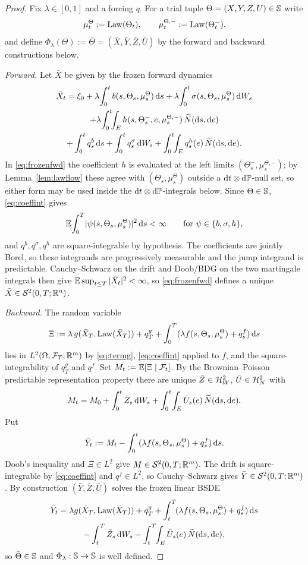 \begin{proof}
Fix $\lambda\in[0,1]$ and a forcing $q$. For a trial tuple $\Theta=(X,Y,Z,U)\in\mathbb{S}$ write
\[
\mu^\Theta_t:=\mathrm{Law}(\Theta_t),\qquad\mu^{\Theta,-}_t:=\mathrm{Law}(\Theta_t^-),
\]
and define $\Phi_\lambda(\Theta):=\bar\Theta=(\bar X,\bar Y,\bar Z,\bar U)$ by the forward and
backward constructions below.

\emph{Forward.} Let $\bar X$ be given by the frozen forward dynamics
\begin{multline}\label{eq:frozenfwd}
\bar X_t=\xi_0+\lambda\!\int_0^t b(s,\Theta_s,\mu^\Theta_s)\,\mathrm{d} s
+\lambda\!\int_0^t\sigma(s,\Theta_s,\mu^\Theta_s)\,\mathrm{d} W_s\\
+\lambda\!\int_0^t\!\!\int_E h(s,\Theta_s^-,e,\mu^{\Theta,-}_s)\,\widetilde{N}(\mathrm{d} s,\mathrm{d} e)\\
+\int_0^t q^b_s\,\mathrm{d} s+\int_0^t q^\sigma_s\,\mathrm{d} W_s+\int_0^t\!\!\int_E q^h_s(e)\,\widetilde{N}(\mathrm{d} s,\mathrm{d} e).
\end{multline}
In \eqref{eq:frozenfwd} the coefficient $h$ is evaluated at the left limits
$(\Theta^-_s,\mu^{\Theta,-}_s)$; by Lemma~\ref{lem:lawflow} these agree with
$(\Theta_s,\mu^\Theta_s)$ outside a $\mathrm{d} t\otimes\mathrm{d}\mathbb{P}$-null set, so either form may be
used inside the $\mathrm{d} t\otimes\mathrm{d}\mathbb{P}$-integrals below.
Since $\Theta\in\mathbb{S}$, \eqref{eq:coeffint} gives
\[
\mathbb{E}\!\int_0^T\!|\psi(s,\Theta_s,\mu^\Theta_s)|^2\,\mathrm{d} s<\infty
\qquad\text{for }\psi\in\{b,\sigma,h\},
\]
and $q^b,q^\sigma,q^h$ are square-integrable by hypothesis. The coefficients are jointly Borel,
so these integrands are progressively measurable and the jump integrand is predictable.
Cauchy--Schwarz on the drift and Doob/BDG on the two martingale integrals then give
$\mathbb{E}\sup_{t\le T}|\bar X_t|^2<\infty$, so \eqref{eq:frozenfwd} defines a unique
$\bar X\in\mathcal{S}^2(0,T;\mathbb{R}^n)$.

\emph{Backward.} The random variable
\[
\Xi:=\lambda\,g(\bar X_T,\mathrm{Law}(\bar X_T))+q^g_T+\int_0^T(\lambda f(s,\Theta_s,\mu^\Theta_s)+q^f_s)\,\mathrm{d} s
\]
lies in $L^2(\Omega,\mathcal{F}_T;\mathbb{R}^m)$ by \eqref{eq:termg}, \eqref{eq:coeffint} applied to $f$, and the
square-integrability of $q^g_T$ and $q^f$. Set $M_t:=\mathbb{E}[\Xi\mid\mathcal{F}_t]$. By the Brownian--Poisson
predictable representation property there are unique
$\bar Z\in\mathcal{H}^2_W$, $\bar U\in\mathcal{H}^2_N$ with
\[
M_t=M_0+\int_0^t\bar Z_s\,\mathrm{d} W_s+\int_0^t\!\int_E\bar U_s(e)\,\widetilde{N}(\mathrm{d} s,\mathrm{d} e).
\]
Put
\[
\bar Y_t:=M_t-\int_0^t(\lambda f(s,\Theta_s,\mu^\Theta_s)+q^f_s)\,\mathrm{d} s .
\]
Doob's inequality and $\Xi\in L^2$ give $M\in\mathcal{S}^2(0,T;\mathbb{R}^m)$. The drift is square-integrable by
\eqref{eq:coeffint} and $q^f\in L^2$, so Cauchy--Schwarz gives $\bar Y\in\mathcal{S}^2(0,T;\mathbb{R}^m)$. By construction
$(\bar Y,\bar Z,\bar U)$ solves the frozen linear BSDE
\begin{multline}\label{eq:frozenbwd}
\bar Y_t=\lambda g(\bar X_T,\mathrm{Law}(\bar X_T))+q^g_T
+\int_t^T\!(\lambda f(s,\Theta_s,\mu^\Theta_s)+q^f_s)\,\mathrm{d} s\\
-\int_t^T\bar Z_s\,\mathrm{d} W_s-\int_t^T\!\!\int_E\bar U_s(e)\,\widetilde{N}(\mathrm{d} s,\mathrm{d} e),
\end{multline}
so $\bar\Theta\in\mathbb{S}$ and $\Phi_\lambda:\mathbb{S}\to\mathbb{S}$ is well defined.


\end{proof}
